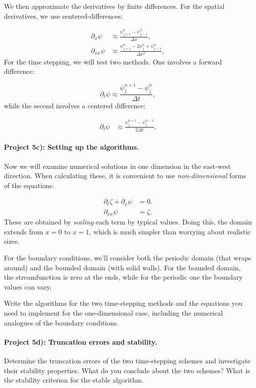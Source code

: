 \documentclass[%
oneside,                 %
final,                   %
10pt]{article}
\begin{document}
We then approximate the derivatives by finite differences. For
the spatial derivatives, we use centered-differences:

\begin{align}
	\partial_x\psi &\approx \frac{\psi_{j+1}^{n} - \psi_{j-1}^{n}}{\Delta x}, \\
	\partial_{xx}\psi &\approx \frac{\psi_{j+1}^{n} - 2\psi_{j}^{n} + \psi_{j-1}^{n}}{\Delta x^2},
\end{align}
For the time stepping, we will test two methods. One involves a
forward difference:

\begin{equation}
  \label{eq:Rossby3}
  \partial_t\psi \approx \frac{\psi_{j}^{n+1} - \psi_{j}^{n}}{\Delta t} ,
\end{equation}
while the second involves a centered difference:

\begin{align}
  \label{eq:Rossby4}
	\partial_t\psi &\approx \frac{\psi_{j}^{n+1} - \psi_{j}^{n-1}}{2\Delta t}.
\end{align}

\paragraph{Project 5c): Setting up the algorithms.}
Now we will examine 
numerical solutions in one dimension in the east-west
direction. When calculating these, it is convenient to use
\emph{non-dimensional} forms of the equations:

\begin{align}
	\partial_t\zeta + \partial_x\psi &= 0. \\
	\partial_{xx}\psi &= \zeta.
\end{align}
These are obtained by \emph{scaling} each term by typical values.
Doing this, the domain extends from $x=0$ to $x=1$, which is
much simpler than worrying about realistic sizes.

For the boundary conditions, we'll consider both the periodic
domain (that wraps around) and the bounded domain (with solid
walls). For the bounded domain, the streamfunction is zero at the
ends, while for the periodic one the boundary values can vary.

Write the algorithms for the two time-stepping methods and the
equations you need to implement for the one-dimensional case,
including the numerical analogues of the boundary conditions.


\paragraph{Project 5d): Truncation errors and stability.}
Determine the truncation errors of the two time-stepping schemes
and investigate their stability properties. What do you conclude
about the two schemes? What is the stability criterion for the
stable algorithm.
\end{document}
